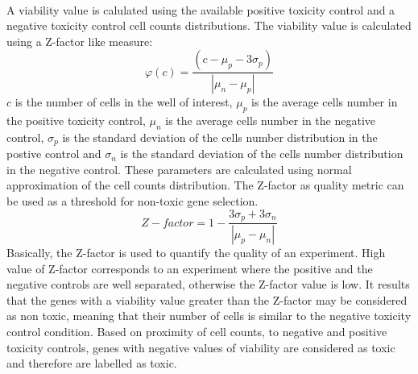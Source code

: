 \documentclass[a4paper,10pt]{article}
\begin{document}
\paragraph{}
 A viability value is calulated using
 the available positive toxicity control and a negative toxicity control cell counts distributions. The viability value
 is calculated using a Z-factor like measure:
 \[\varphi(c)=\frac{(c-\mu_p-3\sigma_p)}{|\mu_n-\mu_p|}\]
 $c$ is the number of cells in the well of interest, $\mu_p$ is the average cells number in the positive toxicity
 control, $\mu_n$ is the average cells number in the negative control, $\sigma_p$ is the standard deviation of the
 cells number distribution in the postive control and $\sigma_n$ is the standard deviation of the cells number
 distribution in the negative control. These parameters are calculated using normal approximation of the cell counts
 distribution. The Z-factor as quality metric can be used as a threshold for non-toxic gene selection.
 \[Z-factor=1-\frac{3\sigma_p+3\sigma_n}{|\mu_p-\mu_n|}\]
 Basically, the Z-factor is used to quantify the quality of an experiment. High value of Z-factor corresponds to
 an experiment where the positive and the negative controls are well separated, otherwise the Z-factor value is low.
 It results that the genes with a viability value greater than the Z-factor may be considered as non toxic, meaning that
 their number of cells is similar to the negative toxicity control condition. Based on proximity of cell counts,
 to negative and positive toxicity controls, genes with negative values of viability are considered as toxic and therefore
 are labelled as toxic.
\end{document}
